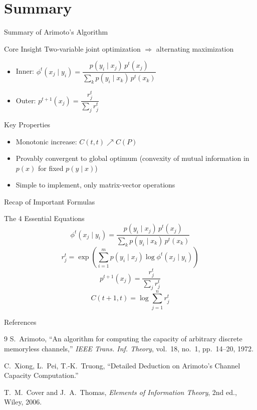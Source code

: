 \documentclass{beamer}
\begin{document}
\section{Summary}

\begin{frame}{Summary of Arimoto's Algorithm}
    \begin{block}{Core Insight}
        Two-variable joint optimization $\Rightarrow$ alternating maximization
        \begin{itemize}
            \item Inner: $\phi^t(x_j \mid y_i) = \dfrac{p(y_i \mid x_j)\, p^t(x_j)}{\sum_k p(y_i \mid x_k)\, p^t(x_k)}$
            \item Outer: $p^{t+1}(x_j) = \dfrac{r_j^t}{\sum_j r_j^t}$
        \end{itemize}
    \end{block}

    \begin{block}{Key Properties}
        \begin{itemize}
            \item Monotonic increase: $C(t, t) \nearrow C(P)$
            \item Provably convergent to global optimum (convexity of mutual information in $p(x)$ for fixed $p(y \mid x)$)
            \item Simple to implement, only matrix-vector operations
        \end{itemize}
    \end{block}
\end{frame}

\begin{frame}{Recap of Important Formulas}
    \footnotesize
    \begin{block}{The 4 Essential Equations}
        $$
            \phi^t(x_j \mid y_i) = \frac{p(y_i \mid x_j)\, p^t(x_j)}{\sum_k p(y_i \mid x_k)\, p^t(x_k)}
        $$
        $$
            r_j^t = \exp\!\left( \sum_{i=1}^{m} p(y_i \mid x_j) \log \phi^t(x_j \mid y_i) \right)
        $$
        $$
            p^{t+1}(x_j) = \frac{r_j^t}{\sum_j r_j^t}
        $$
        $$
            C(t+1, t) = \log \sum_{j=1}^{n} r_j^t
        $$
    \end{block}
\end{frame}

\begin{frame}{References}
    \begin{thebibliography}{9}
        S.~Arimoto, ``An algorithm for computing the capacity of arbitrary discrete memoryless channels,'' \emph{IEEE Trans. Inf. Theory}, vol.~18, no.~1, pp.~14--20, 1972.

        C.~Xiong, L.~Pei, T.-K.~Truong, ``Detailed Deduction on Arimoto's Channel Capacity Computation.''

        T.~M.~Cover and J.~A.~Thomas, \emph{Elements of Information Theory}, 2nd ed., Wiley, 2006.
    \end{thebibliography}
\end{frame}
\end{document}
